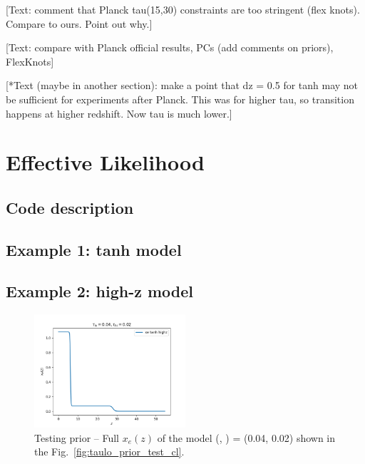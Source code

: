 \documentclass[prd,twocolumn,amsmath,amssymb,floatfix,superscriptaddress,nofootinbib]{revtex4-1}
\begin{document}
[Text: comment that Planck tau(15,30) constraints are too stringent (flex knots). Compare to ours. Point out why.]

[Text: compare with Planck official results, PCs (add comments on priors), FlexKnots]

[*Text (maybe in another section): make a point that dz = 0.5 for tanh may not be sufficient for experiments after Planck. This was for higher tau, so transition happens at higher redshift. Now tau is much lower.]


\section{Effective Likelihood}
\label{sec:effective_likelihood}

\subsection{Code description}
\label{sec:code}

\subsection{Example 1: tanh model}
\label{sec:example1}

\subsection{Example 2: high-z model}
\label{sec:example2}


\begin{figure}
\includegraphics[width=0.5\textwidth]{results/cosmomc_kde/taulo_prior_test/plot_xez_taulo_0p04_tauhi_0p02.png}
\caption{Testing \taulo prior -- Full $x_e(z)$ of the model (\taulo, \tauhi) = (0.04, 0.02) shown in the Fig.~\ref{fig:taulo_prior_test_cl}. 
}
\label{fig:tau_lo_prior_test_xe}
\end{figure}
\end{document}
